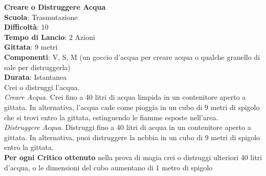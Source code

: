\begin{multicols}{2}
\medskip\textbf{Creare o Distruggere Acqua}\\
\textbf{Scuola}: Trasmutazione\\
\textbf{Difficoltà}:  10\\
\textbf{Tempo di Lancio}: 2 Azioni\\
\textbf{Gittata}: 9 metri\\
\textbf{Componenti}: V, S, M (un goccio d’acqua per creare acqua o qualche granello di sale per distruggerla)\\
\textbf{Durata}: Istantanea\\
Crei o distruggi l’acqua.\\
\textit{Creare Acqua}. Crei fino a 40 litri di acqua limpida in un contenitore aperto a gittata. In alternativa, l’acqua cade come pioggia in un cubo di 9 metri di spigolo che si trovi entro la gittata, estinguendo le fiamme esposte nell'area.\\
\textit{Distruggere Acqua}. Distruggi fino a 40 litri di acqua in un contenitore aperto a gittata. In alternativa, puoi distruggere la nebbia in un cubo di 9 metri di spigolo entro la gittata.\\
\textbf{Per ogni Critico ottenuto} nella prova di magia crei o distruggi ulteriori 40 litri\\ d’acqua, o le dimensioni del cubo aumentano di 1 metro di spigolo


\end{multicols}
